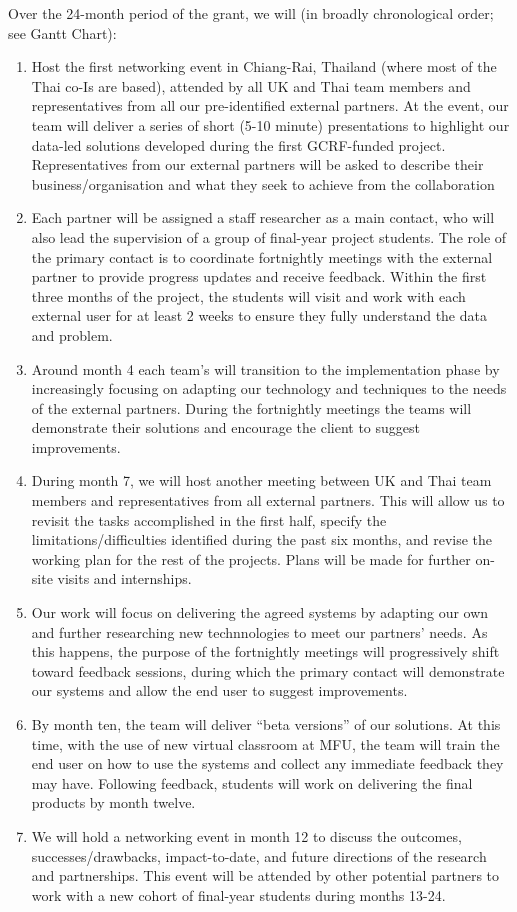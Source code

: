 \documentclass[11pt]{article}
\begin{document}
  \noindent
  Over the 24-month period of the grant, we will (in broadly chronological order; see Gantt Chart):
  \begin{enumerate}[leftmargin=6mm,itemsep=-3pt,topsep=1pt]
  \item Host the first networking event in Chiang-Rai, Thailand (where most of the Thai co-Is are based), attended by all UK and Thai team members and representatives from all our pre-identified external partners. At the event, our team will deliver a series of short (5-10 minute) presentations to highlight our data-led solutions developed during the first GCRF-funded project. Representatives from our external partners will be asked to describe their business/organisation and what they seek to achieve from the collaboration
  \item Each partner will be assigned a staff researcher as a main contact, who will also lead the supervision of a group of final-year project students. The role of the primary contact is to coordinate fortnightly meetings with the external partner to provide progress updates and receive feedback. Within the first three months of the project, the students will visit and work with each external user for at least 2 weeks to ensure they fully understand the data and problem.
  \item Around month 4 each team's will transition to the implementation phase by increasingly focusing on adapting our technology and techniques to the needs of the external partners. During the fortnightly meetings the teams will demonstrate their solutions and encourage the client to suggest improvements.
  \item During month 7, we will host another meeting between UK and Thai team members and representatives from all external partners. This will allow us to revisit the tasks accomplished in the first half, specify the limitations/difficulties identified during the past six months, and revise the working plan for the rest of the projects. Plans will be made for further on-site visits and internships.
  \item Our work will focus on delivering the agreed systems by adapting our own and further researching new technnologies to meet our partners' needs. As this happens, the purpose of the fortnightly meetings will progressively shift toward feedback sessions, during which the primary contact will demonstrate our systems and allow the end user to suggest improvements. 
  \item By month ten, the team will deliver “beta versions” of our solutions. At this time, with the use of new virtual classroom at MFU, the team will train the end user on how to use the systems and collect any immediate feedback they may have. Following feedback, students will work on delivering the final products by month twelve.
  \item We will hold a networking event in month 12 to discuss the outcomes, successes/drawbacks, impact-to-date, and future directions of the research and partnerships. This event will be attended by other potential partners to work with a new cohort of final-year students during months 13-24.
  \end{enumerate}
  
\end{document}
